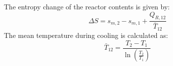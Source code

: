 The entropy change of the reactor contents is given by:  
\[
\Delta S = s_{m,2} - s_{m,1} + \frac{Q_{R,12}}{\bar{T}_{12}}
\]  
The mean temperature during cooling is calculated as:  
\[
\bar{T}_{12} = \frac{T_2 - T_1}{\ln \left( \frac{T_2}{T_1} \right)}
\]